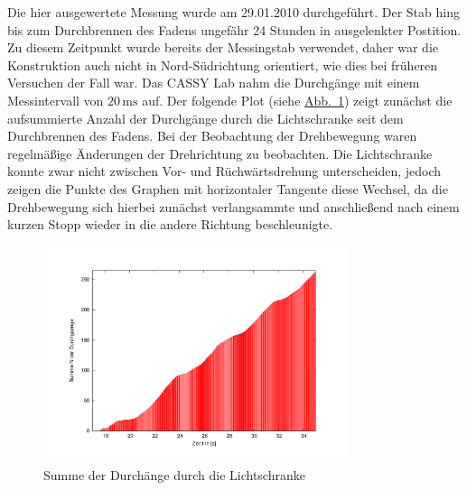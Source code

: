 \documentclass[11pt]{scrartcl}
\newcommand{\unit}[1]{\ensuremath{\,\mathrm{#1}}} %
\newcommand{\hypref}[2]{\hyperref[#2]{{#1}~\ref{#2}}}
\begin{document}
Die hier ausgewertete Messung wurde am 29.01.2010 durchgef\"uhrt. Der Stab hing bis zum Durchbrennen des Fadens ungef\"ahr 24 Stunden in ausgelenkter Postition. Zu diesem Zeitpunkt wurde bereits der Messingstab verwendet, daher war die Konstruktion auch nicht in Nord-S\"udrichtung orientiert, wie dies bei fr\"uheren Versuchen der Fall war. Das CASSY Lab nahm die Durchg\"ange mit einem Messintervall von $20\unit{ms}$ auf. Der folgende Plot (siehe \hypref{Abb.}{durchg29-cassy}) zeigt zun\"achst die aufsummierte Anzahl der Durchg\"ange durch die Lichtschranke seit dem Durchbrennen des Fadens. Bei der Beobachtung der Drehbewegung waren regelm\"a\ss{}ige \"Anderungen der Drehrichtung zu beobachten. Die Lichtschranke konnte zwar nicht zwischen Vor- und R\"uchw\"artsdrehung unterscheiden, jedoch zeigen die Punkte des Graphen mit horizontaler Tangente diese Wechsel, da die Drehbewegung sich hierbei zun\"achst verlangsammte und anschlie\ss{}end nach einem kurzen Stopp wieder in die andere Richtung beschleunigte.
\begin{figure}[ht]
\begin{center}
\includegraphics[width=0.8\textwidth]{durchg29-cassy.pdf}
\end{center}
\vspace{-1.5\baselineskip}
\caption{Summe der Durch\"ange durch die Lichtschranke}
\label{durchg29-cassy}
\end{figure}
\end{document}
